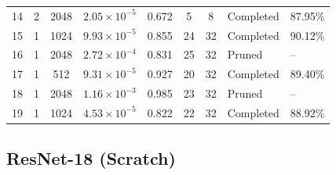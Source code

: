 {\begin{longtable}{lccccccll}
14 & 2 & 2048 & $2.05\times10^{-5}$ & 0.672 & 5 & 8 & Completed & 87.95\% \\
\rowcolor{gray!15} 15 & 1 & 1024 & $9.93\times10^{-5}$ & 0.855 & 24 & 32 & Completed & 90.12\% \\
16 & 1 & 2048 & $2.72\times10^{-4}$ & 0.831 & 25 & 32 & Pruned & -- \\
17 & 1 & 512 & $9.31\times10^{-5}$ & 0.927 & 20 & 32 & Completed & 89.40\% \\
18 & 1 & 2048 & $1.16\times10^{-3}$ & 0.985 & 23 & 32 & Pruned & -- \\
19 & 1 & 1024 & $4.53\times10^{-5}$ & 0.822 & 22 & 32 & Completed & 88.92\% \\
\end{longtable}
}

\Needspace*{0.6\textheight}
\subsection{ResNet-18 (Scratch)}

